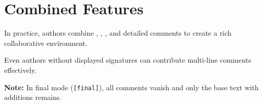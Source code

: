 \documentclass[10pt]{article}
\begin{document}
\section{Combined Features}

In practice, authors combine , , , and detailed comments to create a rich collaborative environment.

\begin{carolienv}
Even authors without displayed signatures
can contribute multi-line comments effectively.
\end{carolienv}

\vspace{0.5em}
\noindent\textbf{Note:} In final mode (\texttt{[final]}), all comments vanish and only the base text with additions remains.
\end{document}
